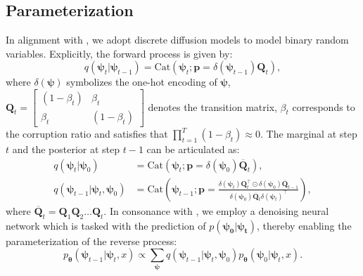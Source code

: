 \documentclass{article}
\begin{document}
\subsection{Parameterization}
In alignment with \citet{austin2021structured}, we adopt discrete diffusion models to model binary random variables. Explicitly, the forward process is given by:
\begin{equation}
    q(\boldsymbol{\psi}_{t} | \boldsymbol{\psi}_{t-1}) =
    \mathrm{Cat}\left(\boldsymbol{\psi}_t ; \mathbf{p} = \delta(\boldsymbol{\psi}_{t-1}) \boldsymbol{Q}_t\right),
\end{equation}
where $\delta(\boldsymbol{\psi})$ symbolizes the one-hot encoding of $\boldsymbol{\psi}$, $\boldsymbol{Q}_t=\begin{bmatrix}(1-\beta_t) & \beta_t \\ \beta_t & (1-\beta_t) \end{bmatrix}$ denotes the transition matrix, $\beta_t$ corresponds to the corruption ratio and satisfies that $\prod_{t=1}^{T}(1-\beta_t) \approx 0$.
The marginal at step $t$ and the posterior at step $t-1$ can be articulated as:
\begin{equation}
\begin{aligned}
    q(\boldsymbol{\psi}_{t} | \boldsymbol{\psi}_{0}) &=
    \mathrm{Cat}\left(\boldsymbol{\psi}_t ; \mathbf{p} =  \delta(\boldsymbol{\psi}_{0}) \overline{\boldsymbol{Q}}_t \right), \\
    q(\boldsymbol{\psi}_{t-1}|\boldsymbol{\psi}_t, \boldsymbol{\psi}_0) &= \mathrm{Cat} \left(
\boldsymbol{\psi}_{t-1} ; \mathbf{p} = \frac{
    \delta(\boldsymbol{\psi}_t) \boldsymbol{Q}_t^{\top} \odot \delta(\boldsymbol{\psi}_0) \overline{\boldsymbol{Q}}_{t-1}
}{\delta(\boldsymbol{\psi}_0) \overline{\boldsymbol{Q}}_t \delta(\boldsymbol{\psi}_t)^\top }
\right),
\end{aligned}
\end{equation}
where $\overline{\boldsymbol{Q}}_t=\boldsymbol{Q}_1\boldsymbol{Q}_2\ldots\boldsymbol{Q}_t$. In consonance with \citet{austin2021structured},
we employ a denoising neural network which is tasked with the prediction of $p(\boldsymbol{\psi_0} | \boldsymbol{\psi_t})$, thereby enabling the parameterization of the reverse process:
\begin{equation} 
    p_{\boldsymbol{\theta}}(\boldsymbol{\psi}_{t-1}|\boldsymbol{\psi}_t, x) \propto \sum_{\boldsymbol{\psi}} q(\boldsymbol{\psi}_{t-1}|\boldsymbol{\psi}_t, \boldsymbol{\psi}_0)  p_{\boldsymbol{\theta}}(\boldsymbol{\psi}_0 | \boldsymbol{\psi}_t, x).
\end{equation}
\end{document}

